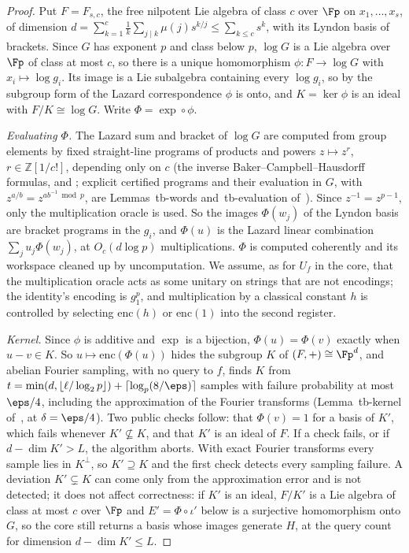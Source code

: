 \begin{proof}
Put $F = F_{s,c}$, the free nilpotent Lie algebra of class $c$ over $\Fp$ on $x_1,\dots,x_s$, of dimension $d = \sum_{k=1}^c \frac1k\sum_{j\mid k}\mu(j)s^{k/j} \le \sum_{k \le c}s^k$, with its Lyndon basis of brackets. Since $G$ has exponent $p$ and class below $p$, $\log G$ is a Lie algebra over $\Fp$ of class at most $c$, so there is a unique homomorphism $\phi : F \to \log G$ with $x_i \mapsto \log g_i$. Its image is a Lie subalgebra containing every $\log g_i$, so by the subgroup form of the Lazard correspondence $\phi$ is onto, and $K = \ker\phi$ is an ideal with $F/K \cong \log G$. Write $\Phi = \exp\circ\phi$.

\emph{Evaluating $\Phi$.} The Lazard sum and bracket of $\log G$ are computed from group elements by fixed straight-line programs of products and powers $z \mapsto z^{r}$, $r \in \mathbb{Z}[1/c!]$, depending only on $c$ (the inverse Baker--Campbell--Hausdorff formulas, \cite[Lemma~10.7 and \S10.2, pp.~115 and~124]{Khukhro1998} and \cite[\S2]{CicaloDeGraafVaughanLee2012}; explicit certified programs and their evaluation in $G$, with $z^{a/b} = z^{ab^{-1} \bmod p}$, are Lemmas~tb-words and~tb-evaluation of~\fullv). Since $z^{-1} = z^{p-1}$, only the multiplication oracle is used. So the images $\Phi(w_j)$ of the Lyndon basis are bracket programs in the $g_i$, and $\Phi(u)$ is the Lazard linear combination $\sum_j u_j\Phi(w_j)$, at $O_c(d\log p)$ multiplications. $\Phi$ is computed coherently and its workspace cleaned up by uncomputation. We assume, as for $U_f$ in the core, that the multiplication oracle acts as some unitary on strings that are not encodings; the identity's encoding is $g_1^p$, and multiplication by a classical constant $h$ is controlled by selecting $\mathrm{enc}(h)$ or $\mathrm{enc}(1)$ into the second register.

\emph{Kernel.} Since $\phi$ is additive and $\exp$ is a bijection, $\Phi(u) = \Phi(v)$ exactly when $u - v \in K$. So $u \mapsto \mathrm{enc}(\Phi(u))$ hides the subgroup $K$ of $(F,+) \cong \Fp^d$, and abelian Fourier sampling, with no query to $f$, finds $K$ from $t = \min(d,\lfloor\ell/\log_2 p\rfloor) + \lceil\log_p(8/\eps)\rceil$ samples with failure probability at most $\eps/4$, including the approximation of the Fourier transforms (Lemma~tb-kernel of~\fullv, at $\delta = \eps/4$). Two public checks follow: that $\Phi(v) = 1$ for a basis of $K'$, which fails whenever $K' \not\subseteq K$, and that $K'$ is an ideal of $F$. If a check fails, or if $d - \dim K' > L$, the algorithm aborts. With exact Fourier transforms every sample lies in $K^\perp$, so $K' \supseteq K$ and the first check detects every sampling failure. A deviation $K' \subsetneq K$ can come only from the approximation error and is not detected; it does not affect correctness: if $K'$ is an ideal, $F/K'$ is a Lie algebra of class at most $c$ over $\Fp$ and $E' = \Phi \circ \iota'$ below is a surjective homomorphism onto $G$, so the core still returns a basis whose images generate $H$, at the query count for dimension $d - \dim K' \le L$.


\end{proof}

